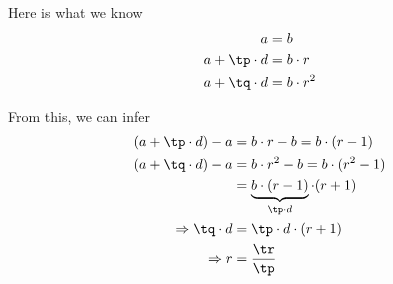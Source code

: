 \watchout

\ifprintanswers
\fi 

\begin{solution}
	Here is what we know 
	\begin{align}
		a &= b \\
		a + \tp\cdot d &= b\cdot r \\
		a + \tq\cdot d &= b\cdot r^2 
	\end{align}
	
	From this, we can infer 
	\begin{align}
		(a + \tp\cdot d) - a &= b\cdot r - b = b\cdot(r-1) \\
		(a + \tq\cdot d) - a &= b\cdot r^2 - b = b\cdot(r^2-1) \\ 
		&= \underbrace{b\cdot(r-1)}_{\tp\cdot d}\cdot(r+1) \\
		\Rightarrow \tq\cdot d &= \tp\cdot d \cdot (r + 1) \\ 
		\Rightarrow r &= \dfrac{\tr}{\tp}
	\end{align}
\end{solution}
